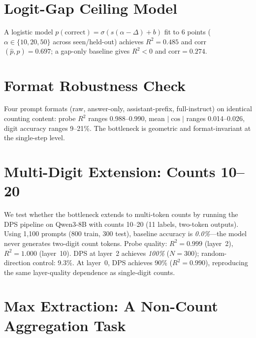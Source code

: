 \documentclass{article}
\begin{document}
\section{Logit-Gap Ceiling Model}
\label{sec:logit_gap_model}

A logistic model $p(\text{correct})=\sigma(s(\alpha-\Delta)+b)$ fit to 6 points
($\alpha \in \{10,20,50\}$ across seen/held-out) achieves $R^2=0.485$ and
corr$(\hat p,p)=0.697$; a gap-only baseline gives $R^2<0$ and corr$=0.274$.

\section{Format Robustness Check}
\label{sec:format_robustness}

Four prompt formats (raw, answer-only, assistant-prefix, full-instruct)
on identical counting content: probe $R^2$ ranges 0.988--0.990,
mean $|\cos|$ ranges 0.014--0.026, digit accuracy ranges 9--21\%.
The bottleneck is geometric and format-invariant at the single-step level.

\section{Multi-Digit Extension: Counts 10--20}
\label{sec:multidigit}

We test whether the bottleneck extends to multi-token counts by running the DPS
pipeline on Qwen3-8B with counts 10--20 (11 labels, two-token outputs).
Using 1{,}100 prompts (800 train, 300 test), baseline accuracy is \emph{0.0\%}---the
model never generates two-digit count tokens.
Probe quality: $R^2 = 0.999$ (layer~2), $R^2 = 1.000$ (layer~10).
DPS at layer~2 achieves \emph{100\%} ($N = 300$); random-direction control: 9.3\%.
At layer~0, DPS achieves 90\% ($R^2 = 0.990$), reproducing the same
layer-quality dependence as single-digit counts.

\section{Max Extraction: A Non-Count Aggregation Task}
\label{sec:max_extraction}
\end{document}

